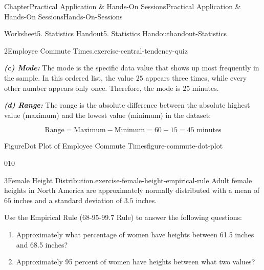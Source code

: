 \documentclass[oneside,10pt,]{book}
\newcommand{\alert}[1]{\textbf{\textit{#1}}}
\begin{document}
\begin{chapterptx}{Chapter}{Practical Application \& Hands-On Sessions}{}{Practical Application \& Hands-On Sessions}{}{}{Hands-On-Sessions}
\begin{worksheet-section}{Worksheet}{5. Statistics Handout}{}{5. Statistics Handout}{}{}{handout-Statistics}
\begin{divisionexercise}{2}{Employee Commute Times.}{}{exercise-central-tendency-quiz}
\par
\alert{(c) Mode:} The mode is the specific data value that shows up most frequently in the sample. In this ordered list, the value \(25\) appears three times, while every other number appears only once. Therefore, the mode is \(25\) minutes.%
\par
\alert{(d) Range:} The range is the absolute difference between the absolute highest value (maximum) and the lowest value (minimum) in the dataset:%
\par
%
\begin{equation*}
\text{Range} = \text{Maximum} - \text{Minimum} = 60 - 15 = 45 \text{ minutes}
\end{equation*}
%
\begin{figureptx}{Figure}{Dot Plot of Employee Commute Times}{figure-commute-dot-plot}{}%
\begin{image}{0}{1}{0}{}%
%
\end{image}%
\tcblower
\end{figureptx}%
\end{divisionexercise}%
\clearpage
\begin{divisionexercise}{3}{Female Height Distribution.}{}{exercise-female-height-empirical-rule}%
Adult female heights in North America are approximately normally distributed with a mean of \(65\) inches and a standard deviation of \(3.5\) inches.%
\par
Use the Empirical Rule (68-95-99.7 Rule) to answer the following questions:%
\begin{enumerate}[label={\arabic*}]
\item{}Approximately what percentage of women have heights between 61.5 inches and 68.5 inches?%
\item{}Approximately 95 percent of women have heights between what two values?%

\end{enumerate}
\end{divisionexercise}
\end{worksheet-section}
\end{chapterptx}
\end{document}
